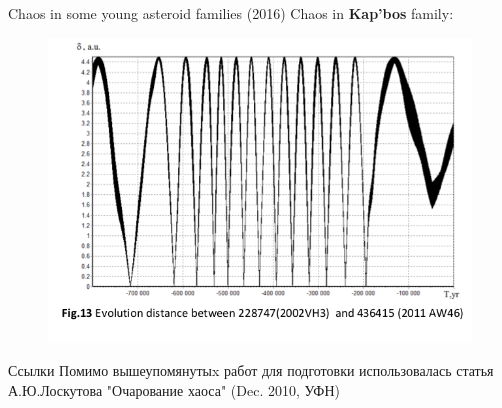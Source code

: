 \documentclass{beamer}
\begin{document}
\begin{frame}{Chaos in some young asteroid families (2016)}
        Chaos in \textbf{Kap'bos} family:
\begin{figure}[h]
\begin{minipage}[h]{0.8\linewidth}
\includegraphics[width=1\linewidth]{./16_6.png}
\end{minipage}
\end{figure}
\end{frame}






\begin{frame}{Ссылки}
        Помимо вышеупомянутыx работ для подготовки использовалась статья А.Ю.Лоскутова "Очарование хаоса" (Dec. 2010, УФН)
\end{frame}
\end{document}
